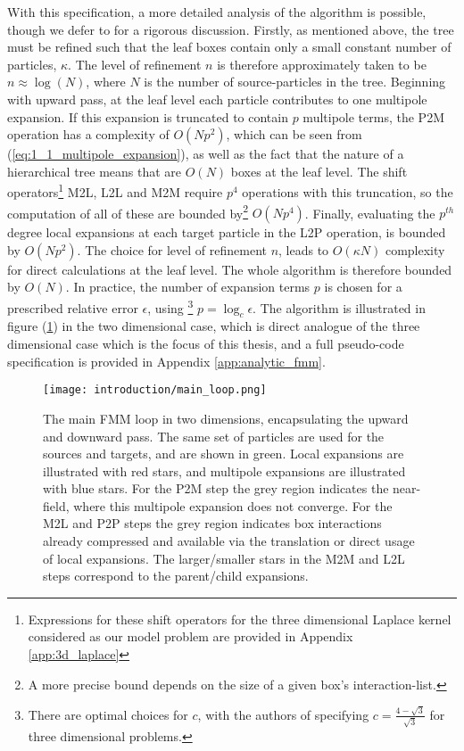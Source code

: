 With this specification, a more detailed analysis of the algorithm is possible,
though we defer to \cite{Greengard:1987:Yale} for a rigorous discussion.
Firstly, as mentioned above, the tree must be refined such that the leaf boxes
contain only a small constant number of particles, $\kappa$. The level of refinement $n$
is therefore approximately taken to be $n \approx \log(N)$, where $N$ is the number
of \gls{source-particles} in the tree. Beginning with upward pass, at the leaf level each particle contributes to one
multipole expansion. If this expansion is truncated to contain $p$ multipole terms, the
\gls{P2M} operation has a complexity of $O(Np^2)$, which can be seen from
(\ref{eq:1_1_multipole_expansion}), as well as the fact that the nature of a
hierarchical tree means that are $O(N)$ boxes at the leaf level. The shift operators\footnote{
    Expressions for these shift operators for the three dimensional Laplace kernel
    considered as our model problem are provided in Appendix \ref{app:3d_laplace}
} \gls{M2L}, \gls{L2L} and \gls{M2M} require $p^4$ operations with this truncation,
so the computation of all of these are bounded by\footnote{A more precise
bound depends on the size of a given box's \gls{interaction-list}.} $O(Np^4)$. Finally,
evaluating the $p^{th}$ degree local expansions at each target particle in the
\gls{L2P} operation, is bounded by $O(Np^2)$. The choice for level of refinement
$n$, leads to $O(\kappa N)$ complexity for direct calculations at the
leaf level. The whole algorithm is therefore bounded by $O(N)$.
In practice, the number of expansion terms $p$ is chosen for a prescribed relative error $\epsilon$, using
\footnote{There are optimal choices for $c$, with the authors of \cite{Ying:2004:JCP}
specifying $c=\frac{4-\sqrt{3}}{\sqrt{3}}$ for three dimensional problems.}
$p=\log_c \epsilon$. The algorithm is illustrated in figure (\ref{fig:1_1_main_loop})
in the two dimensional case, which is direct analogue of the three dimensional case
which is the focus of this thesis, and a full pseudo-code specification is
provided in Appendix \ref{app:analytic_fmm}.

\begin{figure}[!h]
    \centering
    {\texttt{[image: introduction/main\_loop.png]}}
  \caption{
      The main FMM loop in two dimensions, encapsulating the upward and downward
      pass. The same set of particles are used for the sources and targets, and
      are shown in green. Local expansions are illustrated with red stars, and
      multipole expansions are illustrated with blue stars. For the P2M step the
      grey region indicates the \gls{near-field}, where this multipole expansion
      does not converge. For the M2L and P2P steps the grey region indicates
      box interactions already compressed and available via the translation or
      direct usage of local expansions. The larger/smaller stars in the M2M and
      L2L steps correspond to the parent/child expansions.
  }
  \label{fig:1_1_main_loop}
\end{figure}


